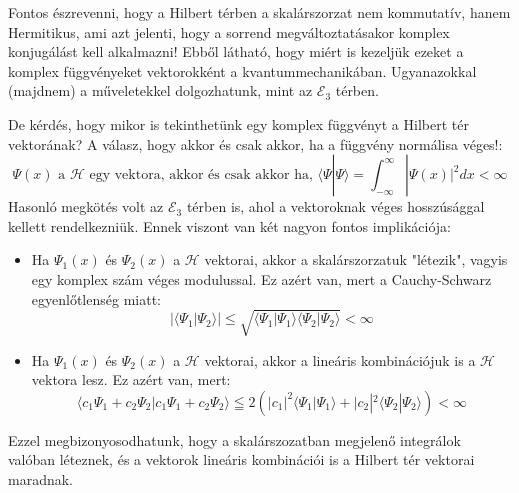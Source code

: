 \documentclass[../main.tex]{subfiles}
\begin{document}
Fontos észrevenni, hogy a Hilbert térben a skalárszorzat nem kommutatív, hanem Hermitikus, ami azt jelenti, hogy a sorrend megváltoztatásakor komplex konjugálást kell alkalmazni!
Ebből látható, hogy miért is kezeljük ezeket a komplex függvényeket vektorokként a kvantummechanikában. Ugyanazokkal (majdnem) a műveletekkel dolgozhatunk, mint az $\mathcal{E}_3$ térben.

De kérdés, hogy mikor is tekinthetünk egy komplex függvényt a Hilbert tér vektorának? A válasz, hogy akkor és csak akkor, ha a függvény normálisa véges!:
\begin{equation}
    \Psi(x) \text{ a $\mathcal{H}$ egy vektora, akkor és csak akkor ha, } \langle \Psi | \Psi \rangle = \int_{-\infty}^{\infty} |\Psi(x)|^2 dx < \infty
\end{equation}
Hasonló megkötés volt az $\mathcal{E}_3$ térben is, ahol a vektoroknak véges hosszúsággal kellett rendelkezniük. Ennek viszont van két nagyon fontos implikációja:
\begin{itemize}
    \item Ha $\Psi_1(x)$ és $\Psi_2(x)$ a $\mathcal{H}$ vektorai, akkor a skalárszorzatuk "létezik", vagyis egy komplex szám véges modulussal. Ez azért van, mert a Cauchy-Schwarz egyenlőtlenség miatt:
    \begin{equation}
        |\langle \Psi_1 | \Psi_2 \rangle| \leq \sqrt{\langle \Psi_1 | \Psi_1 \rangle \langle \Psi_2 | \Psi_2 \rangle} < \infty
    \end{equation}
    \item Ha $\Psi_1(x)$ és $\Psi_2(x)$ a $\mathcal{H}$ vektorai, akkor a lineáris kombinációjuk is a $\mathcal{H}$ vektora lesz. Ez azért van, mert:
    \begin{equation}
        \langle c_1 \Psi_1 + c_2 \Psi_2 | c_1 \Psi_1 + c_2 \Psi_2 \rangle \leqq 2(|c_1|^2 \langle \Psi_1 | \Psi_1 \rangle + |c_2|^2 \langle \Psi_2 | \Psi_2 \rangle) < \infty
    \end{equation}
\end{itemize}
Ezzel megbizonyosodhatunk, hogy a skalárszozatban megjelenő integrálok valóban léteznek, és a vektorok lineáris kombinációi is a Hilbert tér vektorai maradnak.
\end{document}
